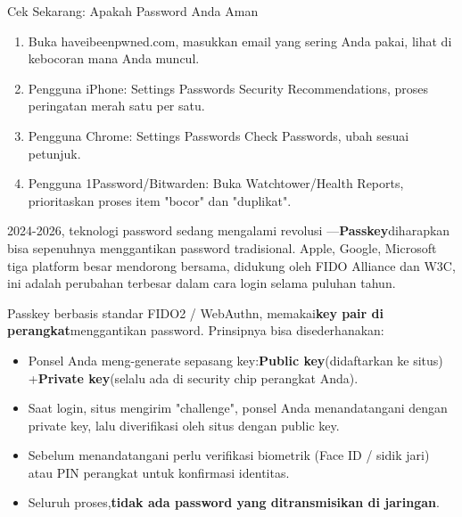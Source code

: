 \begin{tcbpractice}{Cek Sekarang: Apakah Password Anda Aman}
\begin{enumerate}
  \item Buka haveibeenpwned.com, masukkan email yang sering Anda pakai, lihat di kebocoran mana Anda muncul.
  \item Pengguna iPhone: Settings Passwords Security Recommendations, proses peringatan merah satu per satu.
  \item Pengguna Chrome: Settings Passwords Check Passwords, ubah sesuai petunjuk.
  \item Pengguna 1Password/Bitwarden: Buka Watchtower/Health Reports, prioritaskan proses item "bocor" dan "duplikat".
\end{enumerate}

\end{tcbpractice}


2024-2026, teknologi password sedang mengalami revolusi —\textbf{Passkey}diharapkan bisa sepenuhnya menggantikan password tradisional. Apple, Google, Microsoft tiga platform besar mendorong bersama, didukung oleh FIDO Alliance dan W3C, ini adalah perubahan terbesar dalam cara login selama puluhan tahun.


Passkey berbasis standar FIDO2 / WebAuthn, memakai\textbf{key pair di perangkat}menggantikan password. Prinsipnya bisa disederhanakan:

\begin{itemize}
  \item Ponsel Anda meng-generate sepasang key:\textbf{Public key}(didaftarkan ke situs) +\textbf{Private key}(selalu ada di security chip perangkat Anda).
  \item Saat login, situs mengirim "challenge", ponsel Anda menandatangani dengan private key, lalu diverifikasi oleh situs dengan public key.
  \item Sebelum menandatangani perlu verifikasi biometrik (Face ID / sidik jari) atau PIN perangkat untuk konfirmasi identitas.
  \item Seluruh proses,\textbf{tidak ada password yang ditransmisikan di jaringan}.
\end{itemize}


